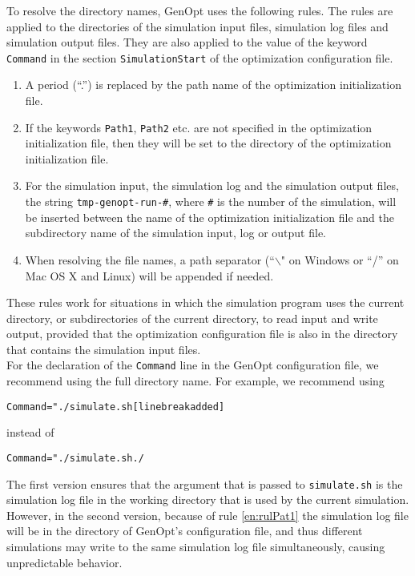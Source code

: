 To resolve the directory names, GenOpt uses the following rules. The rules are applied to 
the directories of the simulation input files, simulation log files and simulation output files.
They are also applied to the value of the keyword
{\tt Command} in the section {\tt SimulationStart} of the optimization configuration file.
\begin{enumerate}
\item \label{en:rulPat1} 
A period (``.'') is replaced by the path name of the optimization initialization file. 
\item
If the keywords {\tt Path1}, {\tt Path2} etc. are not specified in the optimization
initialization file, then they will be set to the directory of the optimization initialization file.
\item
For the simulation input, the simulation log and the simulation output files, 
the string {\tt tmp-genopt-run-\#}, where {\tt \#} is the number of the simulation,
will be inserted between the name of the optimization initialization file 
and the subdirectory name of the simulation input, log or output file.
\item
When resolving the file names, a path separator (``$\backslash$" on Windows or ``/'' on Mac OS X and Linux) will be appended if needed.
\end{enumerate}

These rules work for situations in which the simulation program uses the current
directory, or subdirectories of the current directory,
to read input and write output, provided that the optimization configuration file
is also in the directory that contains the simulation input files.\\

For the declaration of the {\tt Command} line in the GenOpt configuration file,
we recommend using the full directory name. For example, we recommend using
\begin{alltt}
 Command = "./simulate.sh    [linebreak added]
   %Simulation.Files.Log.Path1%/%Simulation.Files.Log.File1%";
\end{alltt}
instead of 
\begin{alltt}
 Command = "./simulate.sh ./%Simulation.Files.Log.File1%";
\end{alltt}
The first version ensures that the argument that is passed to {\tt simulate.sh} 
is the simulation log file in the working directory that is used by the current simulation. 
However, in the second version, because of rule \eqref{en:rulPat1} the simulation log file 
will be in the directory of GenOpt's configuration file, 
and thus different simulations may write to the same simulation log file 
simultaneously, causing unpredictable behavior.

